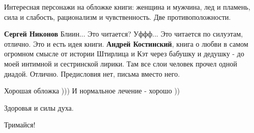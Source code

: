 \begin{itemize}
 

Интересная персонажи на обложке книги: женщина и мужчина, лед и пламень, сила и
слабость, рационализм и чувственность. Две противоположности.

\begin{itemize}
 
\textbf{Сергей Никонов} Блиин... Это читается? Уффф... Это читается по
силуэтам, отлично. Это и есть идея книги. \textbf{Андрей Костинский}, книга о любви в
самом огромном смысле от истории Штирлица и Кэт через бабушку и дедушку - до
моей интимной и сестринской лирики. Там все слои человек прочел одной диадой.
Отлично. Предисловия нет, письма вместо него.
\end{itemize}

 
Хорошая обложка )))
И нормальное лечение - хорошо ))

 
Здоровья и силы духа.

 
Тримайся!

 

\end{itemize}
